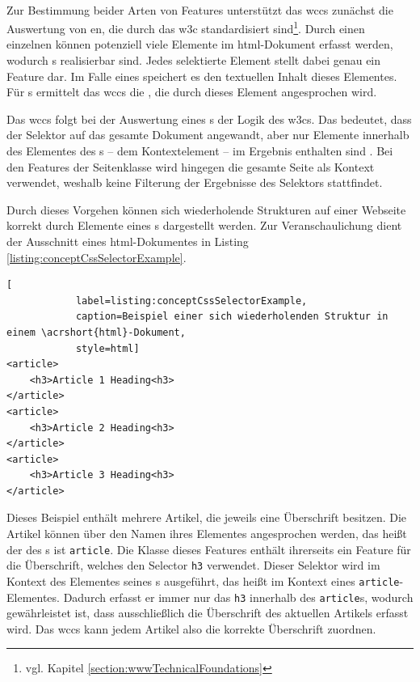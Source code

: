         \paragraph{\cssSelector}
        Zur Bestimmung beider Arten von Features unterstützt das \gls{wccs} zunächst
        die Auswertung von {\cssSelector}en, die durch das \gls{w3c} standardisiert
        sind\footnote{vgl. Kapitel \ref{section:wwwTechnicalFoundations}}.
        Durch einen einzelnen {\cssSelector} können potenziell viele Elemente im \gls{html}-Dokument
        erfasst werden, wodurch {\collectionFeature}s realisierbar sind.
        Jedes selektierte Element stellt dabei genau ein Feature dar.
        Im Falle eines {\contentFeature} speichert es den textuellen Inhalt dieses Elementes.
        Für {}s ermittelt das \gls{wccs} die {\resource},
        die durch dieses Element angesprochen wird.

        Das \gls{wccs} folgt bei der Auswertung eines {\collectionFeature}s der Logik des \glspl{w3c}.
        Das bedeutet, dass der Selektor auf das gesamte Dokument angewandt,
        aber nur Elemente innerhalb des Elementes des {\parentFeature}s -- dem Kontextelement --
        im Ergebnis enthalten sind \cite{w3c:selectorsAPI}.
        Bei den Features der Seitenklasse wird hingegen die gesamte Seite als Kontext verwendet,
        weshalb keine Filterung der Ergebnisse des Selektors stattfindet.
        
        Durch dieses Vorgehen können sich wiederholende Strukturen auf einer Webseite
        korrekt durch Elemente eines {\collectionFeature}s dargestellt werden.
        Zur Veranschaulichung dient der Ausschnitt eines \gls{html}-Dokumentes
        in Listing \ref{listing:conceptCssSelectorExample}.

        \begin{lstlisting}[
            label=listing:conceptCssSelectorExample,
            caption=Beispiel einer sich wiederholenden Struktur in einem \acrshort{html}-Dokument,
            style=html]
<article>
    <h3>Article 1 Heading<h3>
</article>
<article>
    <h3>Article 2 Heading<h3>
</article>
<article>
    <h3>Article 3 Heading<h3>
</article>
        \end{lstlisting}

        Dieses Beispiel enthält mehrere Artikel, die jeweils eine Überschrift besitzen.
        Die Artikel können über den Namen ihres Elementes angesprochen werden,
        das heißt der {\cssSelector} des {\collectionFeature}s ist \texttt{article}.
        Die Klasse dieses Features enthält ihrerseits ein Feature für die Überschrift,
        welches den Selector \texttt{h3} verwendet.
        Dieser Selektor wird im Kontext des Elementes seines {\parentFeature}s ausgeführt,
        das heißt im Kontext eines \texttt{article}-Elementes.
        Dadurch erfasst er immer nur das \texttt{h3} innerhalb des \texttt{article}s,
        wodurch gewährleistet ist, dass ausschließlich die Überschrift des aktuellen Artikels erfasst wird.
        Das \gls{wccs} kann jedem Artikel also die korrekte Überschrift zuordnen.

